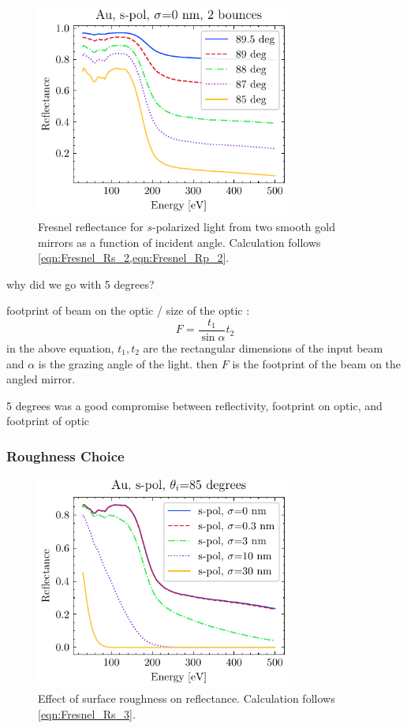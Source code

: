 \begin{figure}
	\centering
	\includegraphics[width=0.75\textwidth]{figures/chap2/Au_ReflvsAngle_2bounce.pdf}
	\caption{Fresnel reflectance for $s$-polarized light from two smooth gold mirrors as a function of incident angle. Calculation follows \cref{eqn:Fresnel_Rs_2,eqn:Fresnel_Rp_2}.}
	\label{fig:Au_ReflvsAngle_2bounce}
\end{figure}

why did we go with 5 degrees?

footprint of beam on the optic / size of the optic \cite{gibaudSpecularReflectivitySmooth2009}:
\begin{equation}
F = \frac{t_1}{\sin \alpha}t_2
\label{eqn:EM_footprint}
\end{equation}
in the above equation, $t_1, t_2$ are the rectangular dimensions of the input beam and $\alpha$ is the grazing angle of the light. then $F$ is the footprint of the beam on the angled mirror.

5 degrees was a good compromise between reflectivity, footprint on optic, and footprint of optic

\subsubsection{Roughness Choice}
\begin{figure}
	\centering
	\includegraphics[width=0.75\textwidth]{figures/chap2/R_vs_roughness.pdf}
	\caption{Effect of surface roughness on reflectance. Calculation follows \cref{eqn:Fresnel_Rs_3}.}
	\label{fig:R_vs_roughness.png}
\end{figure}

